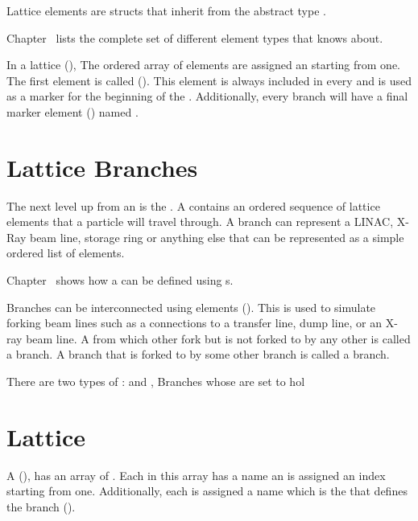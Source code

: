 Lattice elements are structs that inherit from the abstract type .

Chapter~ lists the complete set of different element types that \bmad knows about.



In a lattice  (), The ordered array of elements are assigned an 
starting from one. The first element is called  ().
This element is always included in every   and is used as a
marker for the beginning of the .  Additionally, every branch will have a final
marker element () named .

\section{Lattice Branches}
\label{s:branch.def}

The next level up from an  is the . A 
 contains an ordered sequence of lattice elements that a particle will travel through. A
branch can represent a LINAC, X-Ray beam line, storage ring or anything else that can be represented
as a simple ordered list of elements.

Chapter~ shows how a  can be defined using s.

Branches can be interconnected using  elements (). This
is used to simulate forking beam lines such as a connections to a transfer line, dump line, or an
X-ray beam line. A  from which other  fork but is not forked to by any
other  is called a  branch. A branch that is forked to by some other branch
is called a  branch.

There are two types of :  and , Branches whose  are set to 
hol

\section{Lattice}
\label{s:lattice.def}

A  (), has an array of . Each  in this array
has a name an is assigned an index starting from one. 
Additionally, each  is assigned a name which is the
 that defines the branch ().

